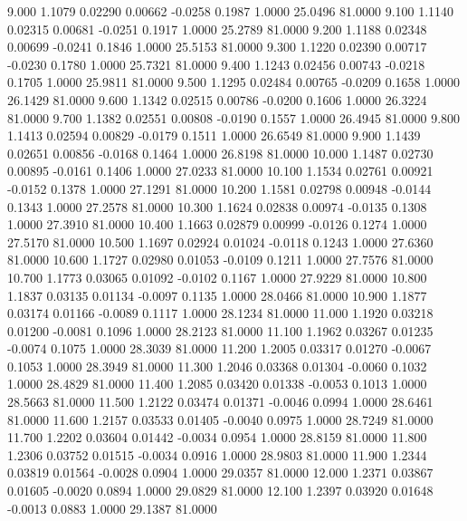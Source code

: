    9.000   1.1079   0.02290   0.00662  -0.0258   0.1987   1.0000  25.0496  81.0000
   9.100   1.1140   0.02315   0.00681  -0.0251   0.1917   1.0000  25.2789  81.0000
   9.200   1.1188   0.02348   0.00699  -0.0241   0.1846   1.0000  25.5153  81.0000
   9.300   1.1220   0.02390   0.00717  -0.0230   0.1780   1.0000  25.7321  81.0000
   9.400   1.1243   0.02456   0.00743  -0.0218   0.1705   1.0000  25.9811  81.0000
   9.500   1.1295   0.02484   0.00765  -0.0209   0.1658   1.0000  26.1429  81.0000
   9.600   1.1342   0.02515   0.00786  -0.0200   0.1606   1.0000  26.3224  81.0000
   9.700   1.1382   0.02551   0.00808  -0.0190   0.1557   1.0000  26.4945  81.0000
   9.800   1.1413   0.02594   0.00829  -0.0179   0.1511   1.0000  26.6549  81.0000
   9.900   1.1439   0.02651   0.00856  -0.0168   0.1464   1.0000  26.8198  81.0000
  10.000   1.1487   0.02730   0.00895  -0.0161   0.1406   1.0000  27.0233  81.0000
  10.100   1.1534   0.02761   0.00921  -0.0152   0.1378   1.0000  27.1291  81.0000
  10.200   1.1581   0.02798   0.00948  -0.0144   0.1343   1.0000  27.2578  81.0000
  10.300   1.1624   0.02838   0.00974  -0.0135   0.1308   1.0000  27.3910  81.0000
  10.400   1.1663   0.02879   0.00999  -0.0126   0.1274   1.0000  27.5170  81.0000
  10.500   1.1697   0.02924   0.01024  -0.0118   0.1243   1.0000  27.6360  81.0000
  10.600   1.1727   0.02980   0.01053  -0.0109   0.1211   1.0000  27.7576  81.0000
  10.700   1.1773   0.03065   0.01092  -0.0102   0.1167   1.0000  27.9229  81.0000
  10.800   1.1837   0.03135   0.01134  -0.0097   0.1135   1.0000  28.0466  81.0000
  10.900   1.1877   0.03174   0.01166  -0.0089   0.1117   1.0000  28.1234  81.0000
  11.000   1.1920   0.03218   0.01200  -0.0081   0.1096   1.0000  28.2123  81.0000
  11.100   1.1962   0.03267   0.01235  -0.0074   0.1075   1.0000  28.3039  81.0000
  11.200   1.2005   0.03317   0.01270  -0.0067   0.1053   1.0000  28.3949  81.0000
  11.300   1.2046   0.03368   0.01304  -0.0060   0.1032   1.0000  28.4829  81.0000
  11.400   1.2085   0.03420   0.01338  -0.0053   0.1013   1.0000  28.5663  81.0000
  11.500   1.2122   0.03474   0.01371  -0.0046   0.0994   1.0000  28.6461  81.0000
  11.600   1.2157   0.03533   0.01405  -0.0040   0.0975   1.0000  28.7249  81.0000
  11.700   1.2202   0.03604   0.01442  -0.0034   0.0954   1.0000  28.8159  81.0000
  11.800   1.2306   0.03752   0.01515  -0.0034   0.0916   1.0000  28.9803  81.0000
  11.900   1.2344   0.03819   0.01564  -0.0028   0.0904   1.0000  29.0357  81.0000
  12.000   1.2371   0.03867   0.01605  -0.0020   0.0894   1.0000  29.0829  81.0000
  12.100   1.2397   0.03920   0.01648  -0.0013   0.0883   1.0000  29.1387  81.0000
